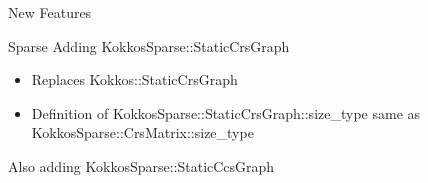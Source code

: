 \begin{frame}[fragile]

  {\Huge New Features}

  \vspace{10pt}

\end{frame}

\begin{frame}[fragile]{Sparse}
  Adding {\ttfamily KokkosSparse::StaticCrsGraph}
  \begin{itemize}
  \item Replaces {\ttfamily Kokkos::StaticCrsGraph}
  \item Definition of {\ttfamily KokkosSparse::StaticCrsGraph::size\_type} same as {\ttfamily KokkosSparse::CrsMatrix::size\_type}
  \end{itemize}
  Also adding {\ttfamily KokkosSparse::StaticCcsGraph}
\end{frame}
